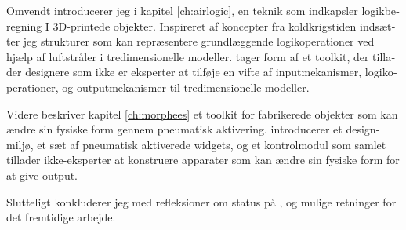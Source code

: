 \begin{otherlanguage}{danish}
				Omvendt introducerer jeg i kapitel \ref{ch:airlogic}, en teknik som
				indkapsler logikberegning I 3D-printede objekter. Inspireret af koncepter
				fra koldkrigstiden indsætter jeg strukturer som kan repræsentere
				grundlæggende logikoperationer ved hjælp af luftstråler i tredimensionelle
				modeller. \al tager form af et toolkit, der tillader designere som ikke er
				eksperter at tilføje en vifte af inputmekanismer, logikoperationer, og
				outputmekanismer til tredimensionelle modeller.
				
				Videre beskriver kapitel \ref{ch:morphees} et toolkit for fabrikerede
				objekter som kan ændre sin fysiske form gennem pneumatisk aktivering. \mp
				introducerer et designmiljø, et sæt af pneumatisk aktiverede widgets, og
				et kontrolmodul som samlet tillader ikke-eksperter at konstruere apparater
				som kan ændre sin fysiske form for at give output.
				
				Slutteligt konkluderer jeg med refleksioner om status på \papf, og mulige
				retninger for det fremtidige arbejde.
		\end{otherlanguage}

\endgroup

	\vfill
